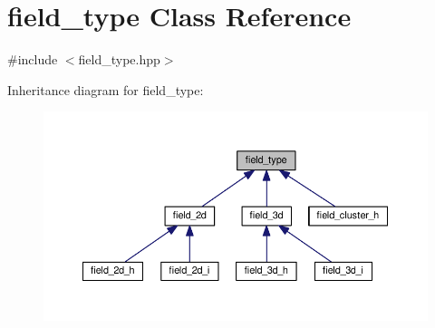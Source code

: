 \hypertarget{classfield__type}{}\section{field\+\_\+type Class Reference}
\label{classfield__type}


{\ttfamily \#include $<$field\+\_\+type.\+hpp$>$}



Inheritance diagram for field\+\_\+type\+:\nopagebreak
\begin{figure}[H]
\begin{center}
\leavevmode
\includegraphics[width=350pt]{de/da8/classfield__type__inherit__graph}
\end{center}
\end{figure}

